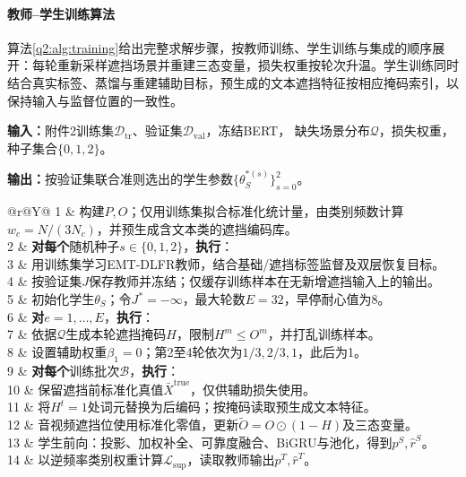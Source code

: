 \paragraph{教师--学生训练算法}
算法\ref{q2:alg:training}给出完整求解步骤，按教师训练、学生训练与集成的顺序展开：每轮重新采样遮挡场景并重建三态变量，损失权重按轮次升温。学生训练同时结合真实标签、蒸馏与重建辅助目标，预生成的文本遮挡特征按相应掩码索引，以保持输入与监督位置的一致性。
\begin{algorithm}[htbp]
\caption{TSRF-D教师--学生联合训练}\label{q2:alg:training}
\small
\textbf{输入：}附件2训练集$\mathcal D_{\mathrm{tr}}$、验证集$\mathcal D_{\mathrm{val}}$，冻结BERT，
缺失场景分布$\mathcal Q$，损失权重，种子集合$\{0,1,2\}$。\par
\textbf{输出：}按验证集联合准则选出的学生参数$\{\theta_S^{*(s)}\}_{s=0}^{2}$。\par
\medskip\noindent
\begin{tabularx}{\linewidth}{@{}r@{\quad}Y@{}}
1 & 构建$P,O$；仅用训练集拟合标准化统计量，由类别频数计算$w_c=N/(3N_c)$，并预生成含文本类的遮挡编码库。\\
2 & \textbf{对每个}随机种子$s\in\{0,1,2\}$，\textbf{执行}：\\
3 & \quad 用训练集学习EMT-DLFR教师，结合基础/遮挡标签监督及双层恢复目标。\\
4 & \quad 按验证集$J$保存教师并冻结；仅缓存训练样本在无新增遮挡输入上的输出。\\
5 & \quad 初始化学生$\theta_S$；令$J^*=-\infty$，最大轮数$E=32$，早停耐心值为8。\\
6 & \quad \textbf{对}$e=1,\ldots,E$，\textbf{执行}：\\
7 & \qquad 依据$\mathcal Q$生成本轮遮挡掩码$H$，限制$H^m\le O^m$，并打乱训练样本。\\
8 & \qquad 设置辅助权重$\beta_1=0$；第2至4轮依次为$1/3,2/3,1$，此后为1。\\
9 & \qquad \textbf{对每个}训练批次$\mathcal B$，\textbf{执行}：\\
10 & \qquad\quad 保留遮挡前标准化真值$\bar X^{\mathrm{true}}$，仅供辅助损失使用。\\
11 & \qquad\quad 将$H^t=1$处词元替换为\file{[UNK]}后编码；按掩码读取预生成文本特征。\\
12 & \qquad\quad 音视频遮挡位使用标准化零值，更新$\widetilde O=O\odot(1-H)$及三态变量。\\
13 & \qquad\quad 学生前向：投影、加权补全、可靠度融合、BiGRU与池化，得到$p^S,\hat r^S$。\\
14 & \qquad\quad 以逆频率类别权重计算$\mathcal L_{\mathrm{sup}}$，读取教师输出$p^T,\hat r^T$。\\

\end{tabularx}
\end{algorithm}
